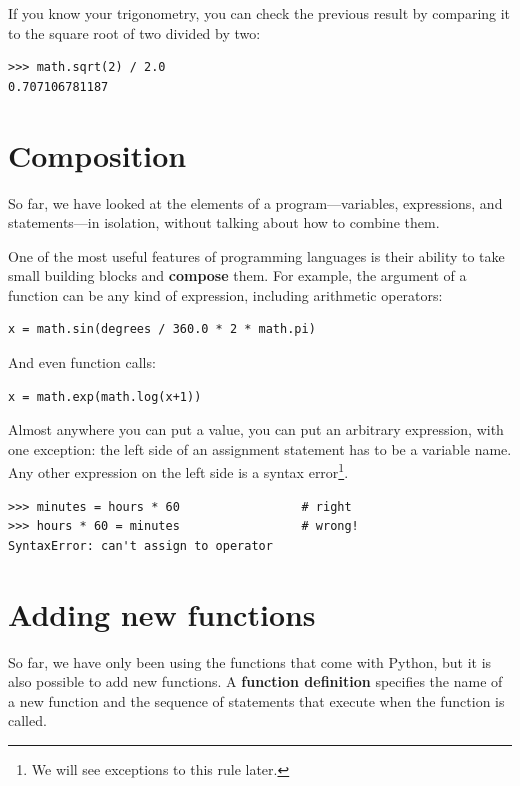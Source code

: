 \documentclass[10pt]{book}
\begin{document}

If you know
your trigonometry, you can check the previous result by comparing it to
the square root of two divided by two:


\beforeverb
\begin{verbatim}
>>> math.sqrt(2) / 2.0
0.707106781187
\end{verbatim}
\afterverb
%

\section{Composition}

So far, we have looked at the elements of a program---variables,
expressions, and statements---in isolation, without talking about how to
combine them.

One of the most useful features of programming languages is their
ability to take small building blocks and {\bf compose} them.  For
example, the argument of a function can be any kind of expression,
including arithmetic operators:

\beforeverb
\begin{verbatim}
x = math.sin(degrees / 360.0 * 2 * math.pi)
\end{verbatim}
\afterverb
%
And even function calls:

\beforeverb
\begin{verbatim}
x = math.exp(math.log(x+1))
\end{verbatim}
\afterverb
%
Almost anywhere you can put a value, you can put an arbitrary
expression, with one exception: the left side of an assignment
statement has to be a variable name.  Any other expression on the left
side is a syntax error\footnote{We will see exceptions to this rule
later.}.

\beforeverb
\begin{verbatim}
>>> minutes = hours * 60                 # right
>>> hours * 60 = minutes                 # wrong!
SyntaxError: can't assign to operator
\end{verbatim}
\afterverb
%


\section{Adding new functions}

So far, we have only been using the functions that come with Python,
but it is also possible to add new functions.
A {\bf function definition} specifies the name of a new function and
the sequence of statements that execute when the function is called.
\end{document}
